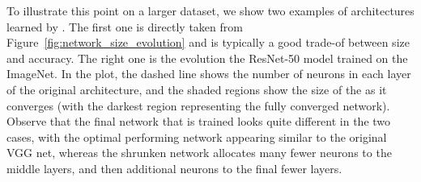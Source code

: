To illustrate this point on a larger dataset, we show two examples of
architectures learned by \shrink. The first one is directly taken from
Figure~\ref{fig:network_size_evolution} and is typically a good trade-of between
size and accuracy. The right one is the evolution the ResNet-50 model
\cite{He2016a} trained on the ImageNet. In the plot, the dashed line
shows the number of neurons in each layer of the original architecture, and the
shaded regions show the size of the \shrink as it converges (with the darkest
region representing the fully converged network).  Observe that the final
network that is trained looks quite different in the two cases, with the optimal
performing network appearing similar to the original VGG net, whereas the
shrunken network allocates many fewer neurons to the middle layers, and then
additional neurons to the final fewer layers.


